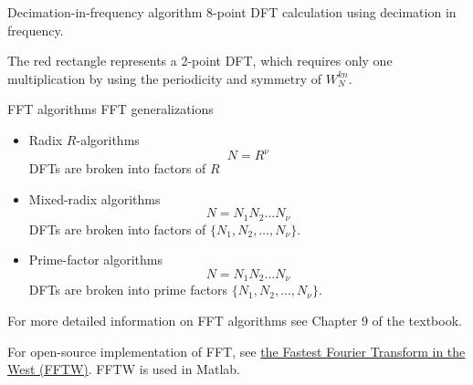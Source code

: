 \documentclass[10pt, handout]{beamer}
\begin{document}
% 
\begin{frame}{Decimation-in-frequency algorithm}
8-point DFT calculation using decimation in frequency.

The red rectangle represents a 2-point DFT, which requires only one multiplication by using the periodicity and symmetry of $W_N^{kn}$. 
\begin{center}
\end{center}
\end{frame}

% 
\begin{frame}{FFT algorithms}
	FFT generalizations
	\begin{itemize}
		\item Radix $R$-algorithms
		\begin{equation*}
			N = R^\nu
		\end{equation*}
		DFTs are broken into factors of $R$
		
		\item Mixed-radix algorithms
		\begin{equation*}
			N = N_1N_2\ldots N_\nu
		\end{equation*}
		DFTs are broken into factors of $\{N_1, N_2, \ldots, N_\nu\}$.
		
		\item Prime-factor algorithms
		\begin{equation*}
			N = N_1N_2\ldots N_\nu
		\end{equation*}
		DFTs are broken into prime factors $\{N_1, N_2, \ldots, N_\nu\}$.
\end{itemize}
\vspace{0.25cm}
For more detailed information on FFT algorithms see Chapter 9 of the textbook.

\vspace{0.25cm}
For open-source implementation of FFT, see \href{http://www.fftw.org/}{the Fastest Fourier Transform in the West (FFTW)}. FFTW is used in Matlab.
\end{frame}
\end{document}
